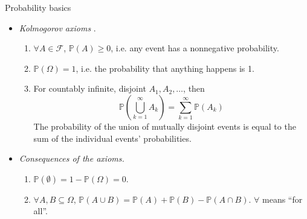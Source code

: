 \documentclass{beamer}
\numberwithin{equation}{section}
\begin{document}
\begin{frame}{Probability basics}
    \begin{itemize}
        \item
        \textit{Kolmogorov axioms} \cite{all_of_stats}.
        \begin{enumerate}
            \item
            $ \forall A \in \mathcal{F} $, $ \mathbb{P}(A) \ge 0 $, i.e. any
            event has a nonnegative probability.

            \item
            $ \mathbb{P}(\Omega) = 1 $, i.e. the probability that anything
            happens is 1.

            \item
            For countably infinite, disjoint $ A_1, A_2, \ldots $, then
            \begin{equation*}
                \mathbb{P}\left(\bigcup_{k = 1}^\infty A_k\right) =
                \sum_{k = 1}^\infty\mathbb{P}(A_k)
            \end{equation*}
            The probability of the union of mutually disjoint events is equal
            to the sum of the individual events' probabilities.
        \end{enumerate}

        \item
        \textit{Consequences of the axioms.}
        \begin{enumerate}
            \item
            $ \mathbb{P}(\emptyset) = 1 - \mathbb{P}(\Omega) = 0 $.

            \item
            $ \forall A, B \subseteq \Omega $, $ \mathbb{P}(A \cup B) =
            \mathbb{P}(A) + \mathbb{P}(B) - \mathbb{P}(A \cap B) $. $ \forall $
            means ``for all''.
        \end{enumerate}
    \end{itemize}
\end{frame}
\end{document}
